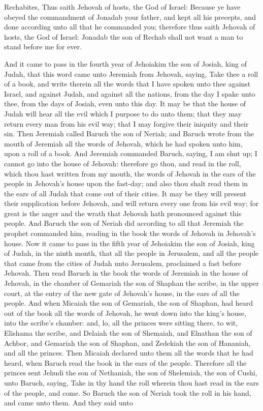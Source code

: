 Rechabites, Thus saith Jehovah of hosts, the God of Israel: Because ye have obeyed the commandment of Jonadab your father, and kept all his precepts, and done according unto all that he commanded you; therefore thus saith Jehovah of hosts, the God of Israel: Jonadab the son of Rechab shall not want a man to stand before me for ever. 

And it came to pass in the fourth year of Jehoiakim the son of Josiah, king of Judah, that this word came unto Jeremiah from Jehovah, saying, Take thee a roll of a book, and write therein all the words that I have spoken unto thee against Israel, and against Judah, and against all the nations, from the day I spake unto thee, from the days of Josiah, even unto this day. It may be that the house of Judah will hear all the evil which I purpose to do unto them; that they may return every man from his evil way; that I may forgive their iniquity and their sin.  Then Jeremiah called Baruch the son of Neriah; and Baruch wrote from the mouth of Jeremiah all the words of Jehovah, which he had spoken unto him, upon a roll of a book. And Jeremiah commanded Baruch, saying, I am shut up; I cannot go into the house of Jehovah: therefore go thou, and read in the roll, which thou hast written from my mouth, the words of Jehovah in the ears of the people in Jehovah’s house upon the fast-day; and also thou shalt read them in the ears of all Judah that come out of their cities. It may be they will present their supplication before Jehovah, and will return every one from his evil way; for great is the anger and the wrath that Jehovah hath pronounced against this people. And Baruch the son of Neriah did according to all that Jeremiah the prophet commanded him, reading in the book the words of Jehovah in Jehovah’s house.  Now it came to pass in the fifth year of Jehoiakim the son of Josiah, king of Judah, in the ninth month, that all the people in Jerusalem, and all the people that came from the cities of Judah unto Jerusalem, proclaimed a fast before Jehovah. Then read Baruch in the book the words of Jeremiah in the house of Jehovah, in the chamber of Gemariah the son of Shaphan the scribe, in the upper court, at the entry of the new gate of Jehovah’s house, in the ears of all the people.  And when Micaiah the son of Gemariah, the son of Shaphan, had heard out of the book all the words of Jehovah, he went down into the king’s house, into the scribe’s chamber: and, lo, all the princes were sitting there, to wit, Elishama the scribe, and Delaiah the son of Shemaiah, and Elnathan the son of Achbor, and Gemariah the son of Shaphan, and Zedekiah the son of Hananiah, and all the princes. Then Micaiah declared unto them all the words that he had heard, when Baruch read the book in the ears of the people. Therefore all the princes sent Jehudi the son of Nethaniah, the son of Shelemiah, the son of Cushi, unto Baruch, saying, Take in thy hand the roll wherein thou hast read in the ears of the people, and come. So Baruch the son of Neriah took the roll in his hand, and came unto them. And they said unto 